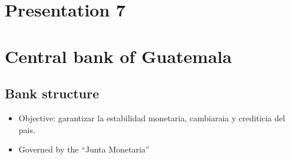 \documentclass[openany]{book}
\begin{document}
\section{Presentation 7}
\section{Central bank of Guatemala}
\subsection{Bank structure}
\begin{itemize}
    \item Objective: garantizar la estabilidad monetaria, cambiaraia y crediticia del pais.
    \item Governed by the ``Junta Monetaria''
\end{itemize}




\end{document}
